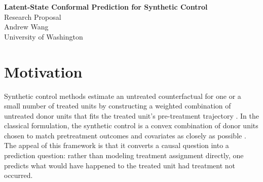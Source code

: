 \documentclass[11pt]{article}
\begin{document}
\begin{center}
{\LARGE \textbf{Latent-State Conformal Prediction for Synthetic Control}}\\[0.5em]
{\large Research Proposal}\\[0.75em]
Andrew Wang\\
University of Washington\\
\vspace{0.5em}
\end{center}

\begin{abstract}
This proposal develops a synthetic-control method for settings in which the untreated relationship between a treated unit and its donors is regime-dependent rather than globally stable. The motivating idea is simple. Standard synthetic control methods estimate a counterfactual by imposing a restricted prediction rule from donors to the treated unit. Chernozhukov, W\"uthrich, and Zhu add a conformal layer that yields valid uncertainty sets for counterfactual paths under weak residual stability conditions. But that method still treats post-treatment discrepancies as if they can be judged against pre-treatment discrepancies after permuting time labels, which is fragile when untreated residuals are themselves regime-dependent. Nettasinghe et al.\ provide a complementary result for Hidden Markov Models (HMMs): exact conformal validity can be recovered when one partitions a non-exchangeable Markov sequence into admissible exchangeable blocks. This proposal integrates those two insights. It argues that synthetic control is best understood as a partially nonparametric prediction problem in which identifying structure is imposed to make the counterfactual learnable, and then proposes to replace global donor weights and time-label permutation with latent-state-conditional prediction and admissible block permutation. The proposed method aims to recover exact finite-sample validity under explicit latent-state assumptions, while also addressing theoretical critiques of synthetic control that conformal synthetic control alone leaves unresolved.
\end{abstract}

\section{Motivation}

Synthetic control methods estimate an untreated counterfactual for one or a small number of treated units by constructing a weighted combination of untreated donor units that fits the treated unit's pre-treatment trajectory \citep{Abadie2003,Abadie2010}. In the classical formulation, the synthetic control is a convex combination of donor units chosen to match pretreatment outcomes and covariates as closely as possible \citep{Abadie2010}. The appeal of this framework is that it converts a causal question into a prediction question: rather than modeling treatment assignment directly, one predicts what would have happened to the treated unit had treatment not occurred.
\end{document}
